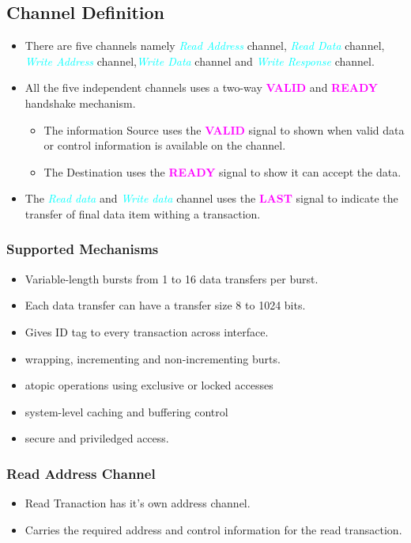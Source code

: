 \documentclass{article}
\newcommand{\chFormat}[1]{\emph{\textcolor{cyan}{#1}}}
\newcommand{\AXISignals}[1]{\textbf{\textcolor{magenta}{#1}}}
\begin{document}
\subsection{Channel Definition}
\begin{itemize}
    \item There are five channels namely \chFormat{Read Address} channel, \chFormat{Read Data} channel, \chFormat{Write Address} channel,\chFormat{Write Data} channel and \chFormat{Write Response} channel.
    \item All the five independent channels uses a two-way \AXISignals{VALID} and \AXISignals{READY} handshake mechanism.
    \begin{itemize}        
        \item The information Source uses the \AXISignals{VALID} signal to shown when valid data or control information is available on the channel.
        \item The Destination uses the \AXISignals{READY} signal to show it can accept the data.
    \end{itemize}
    \item The \chFormat{Read data} and \chFormat{Write data} channel uses the \AXISignals{LAST} signal to indicate the transfer of final data item withing a transaction.   
\end{itemize}
\subsubsection{Supported Mechanisms}
\begin{itemize}
    \item Variable-length bursts from 1 to 16 data transfers per burst.
    \item Each data transfer can have a transfer size 8 to 1024 bits.
    \item Gives ID tag to every transaction across interface.
    \item wrapping, incrementing and non-incrementing burts.
    \item atopic operations  using exclusive or locked accesses
    \item system-level caching and buffering control
    \item secure and priviledged access.
\end{itemize}

\subsubsection{Read Address Channel}
\begin{itemize}
    \item Read Tranaction has it's own address channel.
    \item Carries the required address and control information for the read transaction.
\end{itemize}
\end{document}
